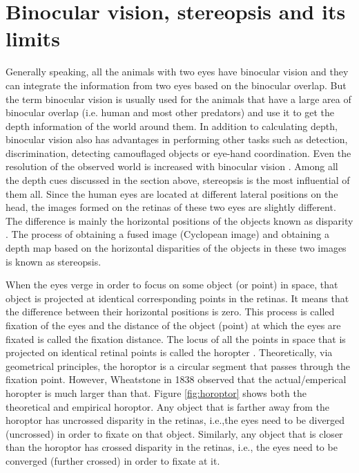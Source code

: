\section{Binocular vision, stereopsis and its limits}
Generally speaking, all the animals with two eyes have binocular vision and they can integrate the information from two eyes based on the binocular overlap. But the term binocular vision is usually used for the animals that have a large area of binocular overlap (i.e. human and most other predators) and use it to get the depth information of the world around them. In addition to calculating depth, binocular vision also has advantages in performing other tasks such as detection, discrimination, detecting camouflaged objects or eye-hand coordination. Even the resolution of the observed world is increased with binocular vision \cite{howard1995binocular}. Among all the depth cues discussed in the section above, stereopsis is the most influential of them all. Since the human eyes are located at different lateral positions on the head, the images formed on the retinas of these two eyes are slightly different. The difference is mainly the horizontal positions of the objects known as disparity \cite{ wiki:stereopsis}. The process of obtaining a fused image (Cyclopean image) and obtaining a depth map based on the horizontal disparities of the objects in these two images is known as stereopsis.

When the eyes verge in order to focus on some object (or point) in space, that object is projected at identical corresponding points in the retinas. It means that the difference between their horizontal positions is zero. This process is called fixation of the eyes and the distance of the object (point) at which the eyes are fixated is called the fixation distance. The locus of all the points in space that is projected on identical retinal points is called the horopter \cite{ wiki:horoptor}. Theoretically, via geometrical principles, the horoptor is a circular segment that passes through the fixation point. However, Wheatstone in 1838 observed that the actual/emperical horopter is much larger than that. Figure \ref{fig:horoptor} shows both the theoretical and empirical horoptor. Any object that is farther away from the horoptor has uncrossed disparity in the retinas, i.e.,the eyes need to be diverged (uncrossed) in order to fixate on that object. Similarly, any object that is closer than the horoptor has crossed disparity in the retinas, i.e., the eyes need to be converged (further crossed) in order to fixate at it.


